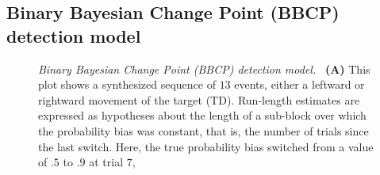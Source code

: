 \documentclass[12pt,english]{article}%
\newcommand{\seeFig}[1]{Figure~\ref{fig:#1}}
\begin{document}
\subsection{Binary Bayesian Change Point (BBCP) detection model}
\label{sec:Binary_Bayesian_change_point}
\begin{figure}%
\caption{\emph{Binary Bayesian Change Point (BBCP) detection model.} ~\textbf{(A)} This plot shows a synthesized sequence of $13$ events,
either a leftward or rightward movement of the target (TD).
Run-length estimates are expressed as hypotheses about the length of a sub-block over which the probability bias was constant,
that is, the number of trials since the last switch.
Here, the true probability bias switched from a value of $.5$ to $.9$ at trial $7$,
}
\end{figure}
\end{document}
